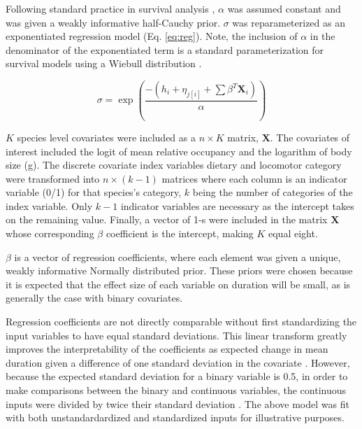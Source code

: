 \documentclass[12pt,letterpaper]{article}
\begin{document}
Following standard practice in survival analysis \citep{Klein2003}, \(\alpha\) was assumed constant and was given a weakly informative half-Cauchy prior. 
\(\sigma\) was reparameterized as an exponentiated regression model (Eq. \ref{eq:reg}). Note, the inclusion of \(\alpha\) in the denominator of the exponentiated term is a standard parameterization for survival models using a Wiebull distribution \citep{Klein2003}.

\begin{equation}
  \sigma = \exp\left(\frac{-(h_{i} + \eta_{j[i]} + \sum \beta^{T} \mathbf{X}_{i})}{\alpha}\right)
  \label{eq:reg}
\end{equation}

\(K\) species level covariates were included as a \(n \times K\) matrix, \(\mathbf{X}\). The covariates of interest included the logit of mean relative occupancy and the logarithm of body size (g). The discrete covariate index variables dietary and locomotor category were transformed into \(n \times (k - 1)\) matrices where each column is an indicator variable (0/1) for that species's category, \(k\) being the number of categories of the index variable. Only \(k - 1\) indicator variables are necessary as the intercept takes on the remaining value. Finally, a vector of 1-s were included in the matrix \(\mathbf{X}\) whose corresponding \(\beta\) coefficient is the intercept, making \(K\) equal eight.

\(\beta\) is a vector of regression coefficients, where each element was given a unique, weakly informative Normally distributed prior. These priors were chosen because it is expected that the effect size of each variable on duration will be small, as is generally the case with binary covariates. %

Regression coefficients are not directly comparable without first standardizing the input variables to have equal standard deviations. This linear transform greatly improves the interpretability of the coefficients as expected change in mean duration given a difference of one standard deviation in the covariate \citep{Schielzeth2010}. However, because the expected standard deviation for a binary variable is 0.5, in order to make comparisons between the binary and continuous variables, the continuous inputs were divided by twice their standard deviation \citep{Gelman2008}. The above model was fit with both unstandardardized and standardized inputs for illustrative purposes.
\end{document}
